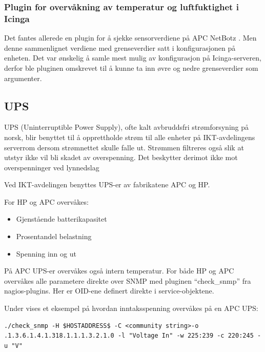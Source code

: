 \subsubsection{Plugin for overvåkning av temperatur og luftfuktighet i Icinga}
Det fantes allerede en plugin for å sjekke sensorverdiene på APC NetBotz \cite{checknetbotz}. Men denne sammenlignet verdiene med grenseverdier satt i konfigurasjonen på enheten. Det var ønskelig å samle mest mulig av konfigurasjon på Icinga-serveren, derfor ble pluginen omskrevet til å kunne ta inn øvre og nedre grenseverdier som argumenter.

\subsection{UPS}
UPS (Uninterruptible Power Supply), ofte kalt avbruddsfri strømforsyning på norsk, blir benyttet til å opprettholde strøm til alle enheter på IKT-avdelingens serverrom dersom strømnettet skulle falle ut. Strømmen filtreres også slik at utstyr ikke vil bli skadet av overspenning. Det beskytter derimot ikke mot overspenninger ved lynnedslag %

Ved IKT-avdelingen benyttes UPS-er av fabrikatene APC og HP.

For HP og APC overvåkes:
\begin{itemize}
 	\item Gjenstående batterikapasitet
	\item Prosentandel belastning
	\item Spenning inn og ut
\end{itemize}
På APC UPS-er overvåkes også intern temperatur. For både HP og APC overvåkes alle parametere direkte over SNMP med pluginen ``check\_snmp'' fra nagios-plugins. Her er OID-ene definert direkte i service-objektene.

Under vises et eksempel på hvordan inntaksspenning overvåkes på en APC UPS:
\begin{lstlisting}[style=example]
./check_snmp -H $HOSTADDRESS$ -C <community string>-o .1.3.6.1.4.1.318.1.1.1.3.2.1.0 -l "Voltage In" -w 225:239 -c 220:245 -u "V"
\end{lstlisting}
